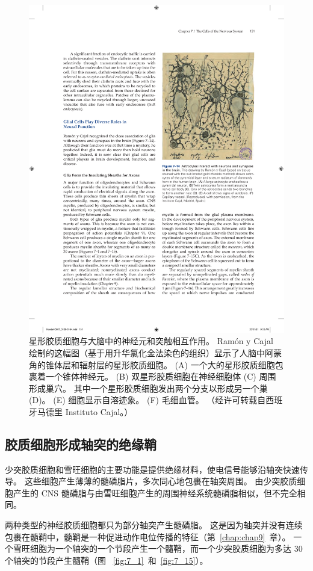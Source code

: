 \begin{figure}[htbp]
	\centering
	\includegraphics[width=0.5\linewidth]{chap07/fig_7_14}
	\caption{星形胶质细胞与大脑中的神经元和突触相互作用。 Ramón y Cajal 绘制的这幅图（基于用升华氯化金法染色的组织）显示了人脑中阿蒙角的锥体层和辐射层的星形胶质细胞。 (A) 一个大的星形胶质细胞包裹着一个锥体神经元。 (B) 双星形胶质细胞在神经细胞体 (C) 周围形成巢穴。 其中一个星形胶质细胞发出两个分支以形成另一个巢 (D)。 (E) 细胞显示自溶迹象。 (F) 毛细血管。 （经许可转载自西班牙马德里 Instituto Cajal。）}
	\label{fig:7_14}
\end{figure}



\subsection{胶质细胞形成轴突的绝缘鞘}

少突胶质细胞和雪旺细胞的主要功能是提供绝缘材料，使电信号能够沿轴突快速传导。
这些细胞产生薄薄的髓磷脂片，多次同心地包裹在轴突周围。
由少突胶质细胞产生的 CNS 髓磷脂与由雪旺细胞产生的周围神经系统髓磷脂相似，但不完全相同。


两种类型的神经胶质细胞都只为部分轴突产生髓磷脂。
这是因为轴突并没有连续包裹在髓鞘中，髓鞘是一种促进动作电位传播的特征（第~\ref{chap:chap9}~章）。 
一个雪旺细胞为一个轴突的一个节段产生一个髓鞘，而一个少突胶质细胞为多达 30 个轴突的节段产生髓鞘（图 ~\ref{fig:7_1}~和~\ref{fig:7_15}）。


